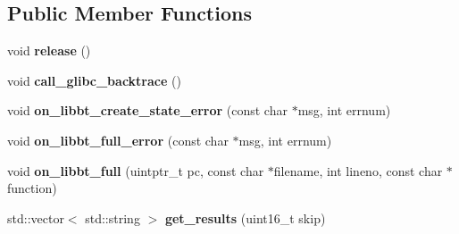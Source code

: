 \subsection*{Public Member Functions}
\begin{DoxyCompactItemize}
\item 
void {\bfseries release} ()\hypertarget{structalps_1_1BacktraceContext_a937b2b9142142e160635cc13936f896c}{}\label{structalps_1_1BacktraceContext_a937b2b9142142e160635cc13936f896c}

\item 
void {\bfseries call\+\_\+glibc\+\_\+backtrace} ()\hypertarget{structalps_1_1BacktraceContext_a42c19d83492f8ff5901f97b71790af57}{}\label{structalps_1_1BacktraceContext_a42c19d83492f8ff5901f97b71790af57}

\item 
void {\bfseries on\+\_\+libbt\+\_\+create\+\_\+state\+\_\+error} (const char $\ast$msg, int errnum)\hypertarget{structalps_1_1BacktraceContext_a2dfa89eef1db391b241659d852e90bba}{}\label{structalps_1_1BacktraceContext_a2dfa89eef1db391b241659d852e90bba}

\item 
void {\bfseries on\+\_\+libbt\+\_\+full\+\_\+error} (const char $\ast$msg, int errnum)\hypertarget{structalps_1_1BacktraceContext_a008aed155d81d3e65d46543c72363470}{}\label{structalps_1_1BacktraceContext_a008aed155d81d3e65d46543c72363470}

\item 
void {\bfseries on\+\_\+libbt\+\_\+full} (uintptr\+\_\+t pc, const char $\ast$filename, int lineno, const char $\ast$function)\hypertarget{structalps_1_1BacktraceContext_a0adf3b6e197546585be28575dfc445f1}{}\label{structalps_1_1BacktraceContext_a0adf3b6e197546585be28575dfc445f1}

\item 
std\+::vector$<$ std\+::string $>$ {\bfseries get\+\_\+results} (uint16\+\_\+t skip)\hypertarget{structalps_1_1BacktraceContext_a44d0d8ee89d984f60e6c35f18689a502}{}\label{structalps_1_1BacktraceContext_a44d0d8ee89d984f60e6c35f18689a502}

\end{DoxyCompactItemize}
